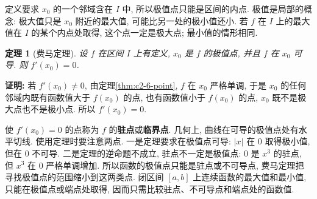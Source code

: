 \documentclass[UTF8,openany]{ctexbook}
\theoremstyle{chinesetextbook}
\newtheorem{theorem}{定理}[section]
\newenvironment{cnproof}{\par\indent\textbf{证明:} \ignorespaces}{\par}
\begin{document}
定义要求 $x_0$ 的一个邻域含在 $I$ 中, 所以极值点只能是区间的内点. 极值是局部的概念: 极大值只是 $x_0$ 附近的最大值, 可能比另一处的极小值还小. 若 $f$ 在 $I$ 上的最大值在 $I$ 的某个内点处取得, 这个点一定是极大点; 最小值的情形相同.
\begin{theorem}[费马定理]\label{thm:c2-6-fermat}
设 $f$ 在区间 $I$ 上有定义, $x_0$ 是 $f$ 的极值点, 并且 $f$ 在 $x_0$ 可导. 则 $f'(x_0)=0$.
\end{theorem}
\begin{cnproof}
若 $f'(x_0)\ne0$, 由定理\ref{thm:c2-6-point}, $f$ 在 $x_0$ 严格单调, 于是 $x_0$ 的任何邻域内既有函数值大于 $f(x_0)$ 的点, 也有函数值小于 $f(x_0)$ 的点, $x_0$ 既不是极大点也不是极小点. 所以 $f'(x_0)=0$.
\end{cnproof}
使 $f'(x_0)=0$ 的点称为 $f$ 的\textbf{驻点}或\textbf{临界点}. 几何上, 曲线在可导的极值点处有水平切线. 使用定理时要注意两点. 一是定理要求在极值点可导: $|x|$ 在 $0$ 取得极小值, 但在 $0$ 不可导. 二是定理的逆命题不成立, 驻点不一定是极值点: $0$ 是 $x^3$ 的驻点, 但 $x^3$ 在 $0$ 严格单调增加. 所以函数的极值点只能是驻点或不可导点, 费马定理把寻找极值点的范围缩小到这两类点. 闭区间 $[a,b]$ 上连续函数的最大值和最小值, 只能在极值点或端点处取得, 因而只需比较驻点、不可导点和端点处的函数值.
\end{document}
